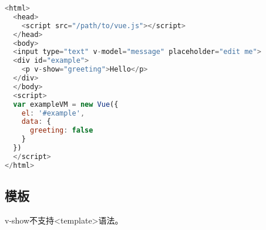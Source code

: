 \begin{lstlisting}[language=JavaScript]
<html>
  <head>
    <script src="/path/to/vue.js"></script>
  </head>
  <body>
  <input type="text" v-model="message" placeholder="edit me">
  <div id="example">
    <p v-show="greeting">Hello</p>
  </div>
  </body>
  <script>
  var exampleVM = new Vue({
    el: '#example',
    data: {
      greeting: false
    }
  })
  </script>
</html>
\end{lstlisting}

\subsection{模板}

v-show不支持<template>语法。


\begin{lstlisting}[language=JavaScript]

\end{lstlisting}



\begin{lstlisting}[language=JavaScript]

\end{lstlisting}




\begin{lstlisting}[language=JavaScript]

\end{lstlisting}




\begin{lstlisting}[language=JavaScript]

\end{lstlisting}




\begin{lstlisting}[language=JavaScript]

\end{lstlisting}




\begin{lstlisting}[language=JavaScript]

\end{lstlisting}




\begin{lstlisting}[language=JavaScript]

\end{lstlisting}




